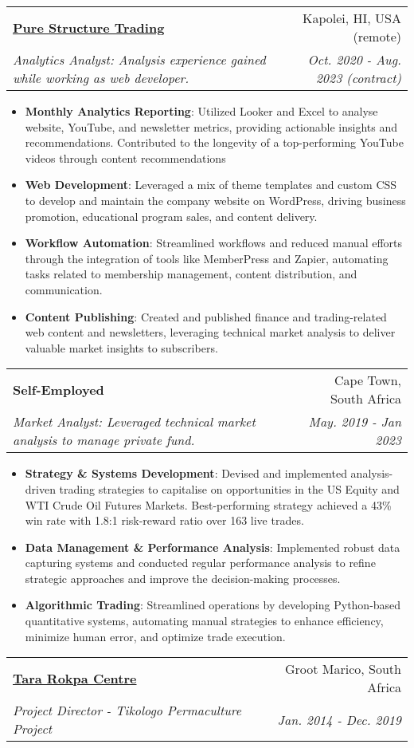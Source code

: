 \documentclass[a4paper,11pt]{article}
\makeatletter
\newcommand{\resumeItem}[2]{
  \item\small{
    \textbf{#1}{: #2 \vspace{-2pt}}
  }
}
\newcommand{\resumeSubheading}[4]{
  \vspace{-1pt}\item
    \begin{tabular*}{0.97\textwidth}[t]{l@{\extracolsep{\fill}}r}
      \textbf{#1} & #2 \\
      \textit{\small#3} & \textit{\small #4} \\
  \end{tabular*}\vspace{-10pt}
}
\newcommand{\resumeItemListStart}{\begin{itemize}}
\newcommand{\resumeItemListEnd}{\end{itemize}\vspace{-10pt}}
\makeatother
\begin{document}
    \resumeSubheading
      {\href{http://purestructuretrading.com/education}{Pure Structure Trading }}{Kapolei, HI, USA (remote)}
      {Analytics Analyst: Analysis experience gained while working as web developer.}{Oct. 2020 - Aug. 2023 (contract)}
      
      \resumeItemListStart
        \resumeItem{Monthly Analytics Reporting}
          {Utilized Looker and Excel to analyse website, YouTube, and newsletter metrics, providing actionable insights and recommendations. Contributed to the longevity of a top-performing YouTube videos through content recommendations}
        \resumeItem{Web Development}
          {Leveraged a mix of theme templates and custom CSS to develop and maintain the company website on WordPress, driving business promotion, educational program sales, and content delivery.}
        \resumeItem{Workflow Automation}
          {Streamlined workflows and reduced manual efforts through the integration of tools like MemberPress and Zapier, automating tasks related to membership management, content distribution, and communication.}
        \resumeItem{Content Publishing}
          {Created and published finance and trading-related web content and newsletters, leveraging technical market analysis to deliver valuable market insights to subscribers.}
      \resumeItemListEnd

    \resumeSubheading
      {Self-Employed}{Cape Town, South Africa}
      {Market Analyst: Leveraged technical market analysis to manage private fund.}{May. 2019 - Jan 2023}
      
      \resumeItemListStart
        \resumeItem{Strategy \& Systems Development}
          {Devised and implemented analysis-driven trading strategies to capitalise on opportunities in the US Equity and WTI Crude Oil Futures Markets. Best-performing strategy achieved a 43\% win rate with 1.8:1 risk-reward ratio over 163 live trades.}
        \resumeItem{Data Management \& Performance Analysis}
          {Implemented robust data capturing systems and conducted regular performance analysis to refine strategic approaches and improve the decision-making processes.}
        \resumeItem{Algorithmic Trading}
          {Streamlined operations by developing Python-based quantitative systems, automating manual strategies to enhance efficiency, minimize human error, and optimize trade execution.}
      \resumeItemListEnd

    \resumeSubheading
      {\href{https://tararokpacentre.co.za/about-tikologo/}{Tara Rokpa Centre}}{Groot Marico, South Africa}
      {Project Director - Tikologo Permaculture Project}{Jan. 2014 - Dec. 2019}
      
\end{document}
